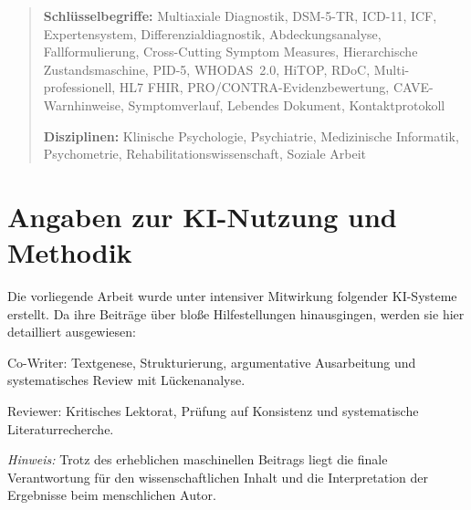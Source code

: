 \documentclass[11pt,a4paper]{article}
\begin{document}
\begin{abstract}
\vspace{0.5em}
\noindent \textbf{Schl\"usselbegriffe:} Multiaxiale Diagnostik, DSM-5-TR, ICD-11, ICF, Expertensystem, Differenzialdiagnostik, Abdeckungsanalyse, Fallformulierung, Cross-Cutting Symptom Measures, Hierarchische Zustandsmaschine, PID-5, WHODAS~2.0, HiTOP, RDoC, Multi-professionell, HL7 FHIR, PRO/CONTRA-Evidenzbewertung, CAVE-Warnhinweise, Symptomverlauf, Lebendes Dokument, Kontaktprotokoll

\vspace{0.5em}
\noindent \textbf{Disziplinen:} Klinische Psychologie, Psychiatrie, Medizinische Informatik, Psychometrie, Rehabilitationswissenschaft, Soziale Arbeit
\end{abstract}

\newpage
\tableofcontents
\newpage

\section*{Angaben zur KI-Nutzung und Methodik}

Die vorliegende Arbeit wurde unter intensiver Mitwirkung folgender KI-Systeme erstellt. Da ihre Beitr\"age \"uber blo\ss{}e Hilfestellungen hinausgingen, werden sie hier detailliert ausgewiesen:

\begin{description}[style=nextline, leftmargin=2cm]
\item[\textbf{Claude Opus 4.6} (Anthropic)] Co-Writer: Textgenese, Strukturierung, argumentative Ausarbeitung und systematisches Review mit L\"uckenanalyse.
\item[\textbf{Gemini} (Google DeepMind) \& \textbf{Copilot} (Microsoft)] Reviewer: Kritisches Lektorat, Pr\"ufung auf Konsistenz und systematische Literaturrecherche.
\end{description}

\vspace{1em}
\noindent\textit{Hinweis:} Trotz des erheblichen maschinellen Beitrags liegt die finale Verantwortung f\"ur den wissenschaftlichen Inhalt und die Interpretation der Ergebnisse beim menschlichen Autor.

\newpage

\end{document}

